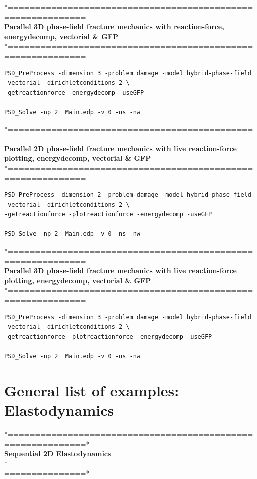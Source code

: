 *============================================================\\
\textbf{ Parallel 3D phase-field fracture mechanics with reaction-force, energydecomp, vectorial \& GFP} \\
*============================================================\\
\begin{lstlisting}[style=BashInputStyle]
PSD_PreProcess -dimension 3 -problem damage -model hybrid-phase-field -vectorial -dirichletconditions 2 \
-getreactionforce -energydecomp -useGFP   

PSD_Solve -np 2  Main.edp -v 0 -ns -nw   	
\end{lstlisting}
*============================================================\\
 \textbf{Parallel 2D phase-field fracture mechanics with live reaction-force plotting, energydecomp, vectorial \& GFP} \\
*============================================================\\
\begin{lstlisting}[style=BashInputStyle]
PSD_PreProcess -dimension 2 -problem damage -model hybrid-phase-field -vectorial -dirichletconditions 2 \
-getreactionforce -plotreactionforce -energydecomp -useGFP  

PSD_Solve -np 2  Main.edp -v 0 -ns -nw   
\end{lstlisting}
*============================================================\\
\textbf{ Parallel 3D phase-field fracture mechanics with live reaction-force plotting, energydecomp, vectorial \& GFP} \\
*============================================================\\
\begin{lstlisting}[style=BashInputStyle]
PSD_PreProcess -dimension 3 -problem damage -model hybrid-phase-field -vectorial -dirichletconditions 2 \
-getreactionforce -plotreactionforce -energydecomp -useGFP   

PSD_Solve -np 2  Main.edp -v 0 -ns -nw   	
\end{lstlisting}

\section{General list of examples: Elastodynamics}

*============================================================*\\
\textbf{ Sequential 2D Elastodynamics}  \\                    
*============================================================*\\

